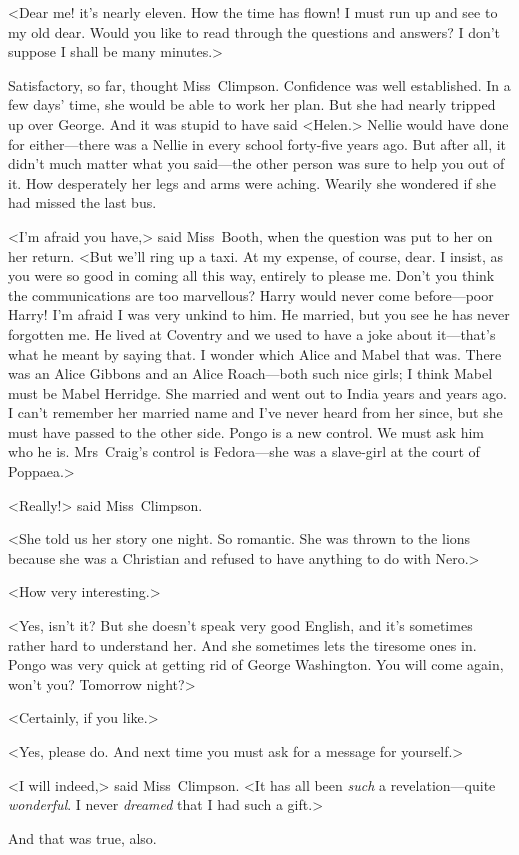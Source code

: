 <Dear me! it's nearly eleven. How the time has flown! I must run up and see to my old dear. Would you like to read through the questions and answers? I don't suppose I shall be many minutes.>

Satisfactory, so far, thought Miss~Climpson. Confidence was well established. In a few days' time, she would be able to work her plan. But she had nearly tripped up over George. And it was stupid to have said <Helen.> Nellie would have done for either—there was a Nellie in every school forty-five years ago. But after all, it didn't much matter what you said—the other person was sure to help you out of it. How desperately her legs and arms were aching. Wearily she wondered if she had missed the last bus.

<I'm afraid you have,> said Miss~Booth, when the question was put to her on her return. <But we'll ring up a taxi. At my expense, of course, dear. I insist, as you were so good in coming all this way, entirely to please me. Don't you think the communications are too marvellous? Harry would never come before—poor Harry! I'm afraid I was very unkind to him. He married, but you see he has never forgotten me. He lived at Coventry and we used to have a joke about it—that's what he meant by saying that. I wonder which Alice and Mabel that was. There was an Alice Gibbons and an Alice Roach—both such nice girls; I think Mabel must be Mabel Herridge. She married and went out to India years and years ago. I can't remember her married name and I've never heard from her since, but she must have passed to the other side. Pongo is a new control. We must ask him who he is. Mrs~Craig's control is Fedora—she was a slave-girl at the court of Poppaea.>

<Really!> said Miss~Climpson.

<She told us her story one night. So romantic. She was thrown to the lions because she was a Christian and refused to have anything to do with Nero.>

<How very interesting.>

<Yes, isn't it? But she doesn't speak very good English, and it's sometimes rather hard to understand her. And she sometimes lets the tiresome ones in. Pongo was very quick at getting rid of George Washington. You will come again, won't you? Tomorrow night?>

<Certainly, if you like.>

<Yes, please do. And next time you must ask for a message for yourself.>

<I will indeed,> said Miss~Climpson. <It has all been \emph{such} a revelation—quite \emph{wonderful}. I never \emph{dreamed} that I had such a gift.>

And that was true, also.